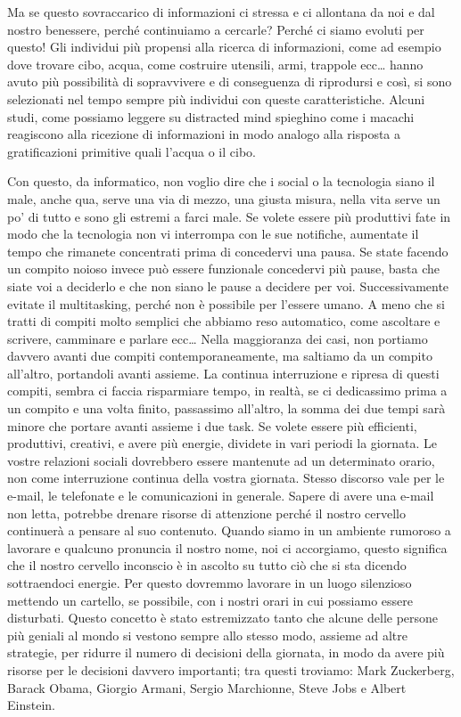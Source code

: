 \documentclass[12pt]{book} %
\begin{document}
\begin{mdframed}[linewidth=1pt]
Ma se questo sovraccarico di informazioni ci stressa e ci allontana da noi e dal nostro benessere, perché continuiamo a
cercarle? Perché ci siamo evoluti per questo! Gli individui più propensi alla ricerca di informazioni, come ad esempio
dove trovare cibo, acqua, come costruire utensili, armi, trappole ecc… hanno avuto più possibilità di sopravvivere e di
conseguenza di riprodursi e così, si sono selezionati nel tempo sempre più individui con queste caratteristiche. Alcuni
studi, come possiamo leggere su distracted
mind spieghino come
i macachi reagiscono alla ricezione di informazioni in modo analogo alla risposta a gratificazioni primitive quali
l'acqua o il cibo. 

Con questo, da informatico, non voglio dire che i social o la tecnologia siano il male, anche qua, serve una via di
mezzo, una giusta misura, nella vita serve un po' di tutto e sono gli estremi a farci male. Se
volete essere più produttivi fate in modo che la tecnologia non vi interrompa con le sue notifiche, aumentate il tempo
che rimanete concentrati prima di concedervi una pausa. Se state facendo un compito noioso invece può essere funzionale
concedervi più pause, basta che siate voi a deciderlo e che non siano le pause a decidere per voi. Successivamente
evitate il multitasking, perché non è possibile per l'essere umano. A meno che si tratti di
compiti molto semplici che abbiamo reso automatico, come ascoltare e scrivere, camminare e parlare ecc… Nella
maggioranza dei casi, non portiamo davvero avanti due compiti contemporaneamente, ma saltiamo da un compito
all'altro, portandoli avanti assieme. La continua interruzione e ripresa di questi compiti, sembra
ci faccia risparmiare tempo, in realtà, se ci dedicassimo prima a un compito e una volta finito, passassimo
all'altro, la somma dei due tempi sarà minore che portare avanti assieme i due task. Se volete
essere più efficienti, produttivi, creativi, e avere più energie, dividete in vari periodi la giornata. Le vostre
relazioni sociali dovrebbero essere mantenute ad un determinato orario, non come interruzione continua della vostra
giornata. Stesso discorso vale per le e-mail, le telefonate e le comunicazioni in generale. Sapere di avere una e-mail
non letta, potrebbe drenare risorse di attenzione perché il nostro cervello continuerà a pensare al suo contenuto.
Quando siamo in un ambiente rumoroso a lavorare e qualcuno pronuncia il nostro nome, noi ci accorgiamo, questo
significa che il nostro cervello inconscio è in ascolto su tutto ciò che si sta dicendo sottraendoci energie. Per
questo dovremmo lavorare in un luogo silenzioso mettendo un cartello, se possibile, con i nostri orari in cui possiamo
essere disturbati. Questo concetto è stato estremizzato tanto che alcune delle persone più geniali al mondo si vestono
sempre allo stesso modo, assieme ad altre strategie, per ridurre il numero di decisioni della giornata, in modo da
avere più risorse per le decisioni davvero importanti; tra questi troviamo: Mark Zuckerberg, Barack Obama, Giorgio
Armani, Sergio Marchionne, Steve Jobs e Albert Einstein.


\end{mdframed}
\end{document}
